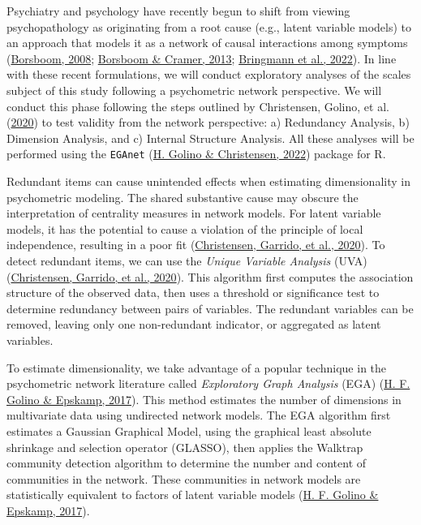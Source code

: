 \documentclass[
  ,doc,11pt, twoside,floatsintext]{apa6}
\begin{document}
Psychiatry and psychology have recently begun to shift from viewing psychopathology as originating from a root cause (e.g., latent variable models) to an approach that models it as a network of causal interactions among symptoms (\protect\hyperlink{ref-borsboom2008}{Borsboom, 2008}; \protect\hyperlink{ref-borsboom2013}{Borsboom \& Cramer, 2013}; \protect\hyperlink{ref-bringmann2022}{Bringmann et al., 2022}). In line with these recent formulations, we will conduct exploratory analyses of the scales subject of this study following a psychometric network perspective. We will conduct this phase following the steps outlined by Christensen, Golino, et al. (\protect\hyperlink{ref-christensen2020b}{2020}) to test validity from the network perspective: a) Redundancy Analysis, b) Dimension Analysis, and c) Internal Structure Analysis. All these analyses will be performed using the \texttt{EGAnet} (\protect\hyperlink{ref-EGAnet}{H. Golino \& Christensen, 2022}) package for R.

Redundant items can cause unintended effects when estimating dimensionality in psychometric modeling. The shared substantive cause may obscure the interpretation of centrality measures in network models. For latent variable models, it has the potential to cause a violation of the principle of local independence, resulting in a poor fit (\protect\hyperlink{ref-christensen2020a}{Christensen, Garrido, et al., 2020}). To detect redundant items, we can use the \emph{Unique Variable Analysis} (UVA) (\protect\hyperlink{ref-christensen2020a}{Christensen, Garrido, et al., 2020}). This algorithm first computes the association structure of the observed data, then uses a threshold or significance test to determine redundancy between pairs of variables. The redundant variables can be removed, leaving only one non-redundant indicator, or aggregated as latent variables.

To estimate dimensionality, we take advantage of a popular technique in the psychometric network literature called \emph{Exploratory Graph Analysis} (EGA) (\protect\hyperlink{ref-golino2017}{H. F. Golino \& Epskamp, 2017}). This method estimates the number of dimensions in multivariate data using undirected network models. The EGA algorithm first estimates a Gaussian Graphical Model, using the graphical least absolute shrinkage and selection operator (GLASSO), then applies the Walktrap community detection algorithm to determine the number and content of communities in the network. These communities in network models are statistically equivalent to factors of latent variable models (\protect\hyperlink{ref-golino2017}{H. F. Golino \& Epskamp, 2017}).
\end{document}
